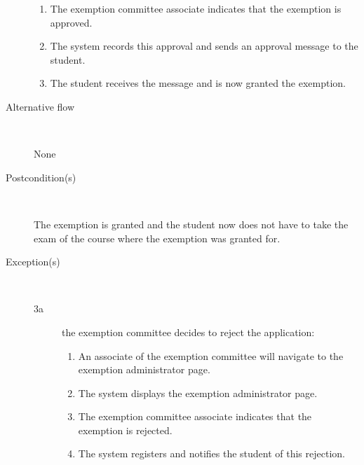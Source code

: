 \begin{description}
\begin{enumerate}
	  	\item The exemption committee associate indicates that the exemption is
	  	approved.
	  	\item The system records this approval and sends an approval message to the
	  	student.
	  	\item The student receives the message and is now granted the exemption.
	\end{enumerate}
	\item[Alternative flow] \
		\par None
	\item[Postcondition(s)] \ 
		\par The exemption is granted and the student now does not have to take the
		exam of the course where the exemption was granted for. 
	\item[Exception(s)] \ 
	\begin{description}
		\item[3a] the exemption committee decides to reject the application:
		\begin{enumerate}
		  \item An associate of the exemption committee will navigate to the exemption administrator page.
		  \item The system displays the exemption administrator page.
		  \item The exemption committee associate indicates that the exemption is
		  rejected.
		  \item The system registers and notifies the student of this rejection.
		\end{enumerate}
	\end{description}
\end{description}